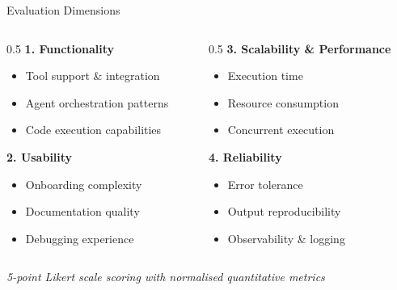 \documentclass[aspectratio=169]{beamer}
\begin{document}
\begin{frame}{Evaluation Dimensions}
    \begin{columns}
        \begin{column}{0.5\textwidth}
            \textbf{1. Functionality}
            \begin{itemize}
                \item Tool support \& integration
                \item Agent orchestration patterns
                \item Code execution capabilities
            \end{itemize}

            \vspace{0.3cm}
            \textbf{2. Usability}
            \begin{itemize}
                \item Onboarding complexity
                \item Documentation quality
                \item Debugging experience
            \end{itemize}
        \end{column}
        \begin{column}{0.5\textwidth}
            \textbf{3. Scalability \& Performance}
            \begin{itemize}
                \item Execution time
                \item Resource consumption
                \item Concurrent execution
            \end{itemize}

            \vspace{0.3cm}
            \textbf{4. Reliability}
            \begin{itemize}
                \item Error tolerance
                \item Output reproducibility
                \item Observability \& logging
            \end{itemize}
        \end{column}
    \end{columns}

    \vspace{0.3cm}
    \centering
    \textit{5-point Likert scale scoring with normalised quantitative metrics}
\end{frame}
\end{document}
